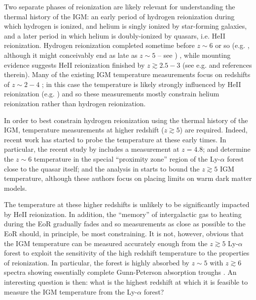 Two separate phases of reionization are likely relevant for understanding the thermal history of the IGM: an early period
of hydrogen reionization during which hydrogen is ionized, and helium is singly ionized by star-forming galaxies, and a later period 
in which helium is doubly-ionized by quasars, i.e. HeII reionization. Hydrogen reionization completed sometime 
before $z \sim 6$ or so (e.g. \citealt{Fan:2005es}, although it might conceivably end
as late as $z \sim 5$ -- see \citealt{McGreer:2011dm,Mesinger:2009mv,Lidz:2007mz}) ,
while mounting evidence suggests HeII reionization finished by $z \gtrsim 2.5-3$ (see e.g. \citealt{Worseck:2011qk,Syphers:2011uw} and references therein). 
Many of the existing IGM temperature measurements focus on redshifts of
$z \sim 2-4$ \citep{Schaye:1999vr,Ricotti:1999hx,McDonald:2000nn,Zaldarriaga:2000mz,Theuns:2001my,Lidz:2009ca};
in this case the temperature is likely strongly influenced by HeII
reionization (e.g. \citealt{McQuinn:2008am}) and so these measurements
mostly constrain helium reionization rather than hydrogen reionization.

In order to best constrain hydrogen reionization using the
thermal history of the IGM, temperature measurements
at higher redshift ($z \gtrsim 5$) are required. Indeed, recent work
has started to probe the temperature at these early times. In particular,
the recent study by \citet{Becker:2012aq} includes a measurement
at $z=4.8$; \citet{Bolton:2011ck} and \citet{Raskutti:2012qz} determine
the $z \sim 6$ temperature in the special ``proximity zone'' region of the Ly-$\alpha$
forest close to the quasar itself; and the analysis in \citet{Viel:2013fqw} starts to bound
the $z \gtrsim 5$ IGM temperature, although these authors focus on placing
limits on warm dark matter models.

The temperature at these higher redshifts is unlikely to be significantly impacted by HeII reionization. 
In addition, the ``memory'' of intergalactic gas to heating during the EoR gradually fades and so measurements as close as possible
to the EoR should, in principle, be most constraining.
It is not, however, obvious that the IGM temperature can be measured accurately enough 
from the $z \gtrsim 5$ Ly-$\alpha$ forest to exploit the sensitivity of the high redshift temperature to the properties of reionization. In particular, the forest is highly absorbed by $z \sim 5$ with $z \gtrsim 6$ spectra showing
essentially complete Gunn-Peterson \citep{1965ApJ...142.1633G} absorption troughs \citep{Becker:2001ee,Fan:2005es}. An interesting question is then: what is the highest redshift at which it is feasible
to measure the IGM temperature from the Ly-$\alpha$ forest?

